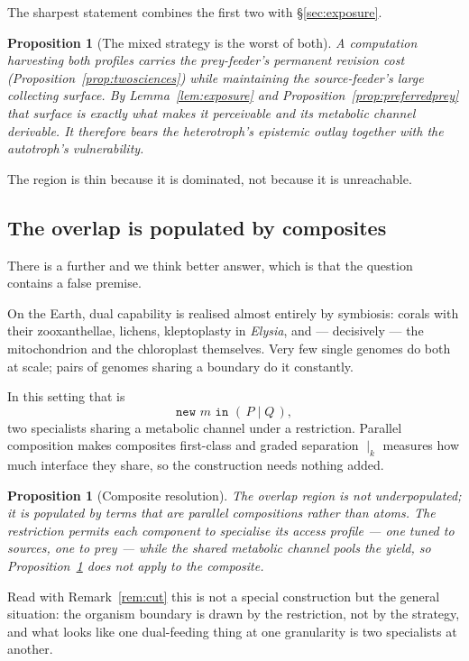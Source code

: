 \documentclass[11pt]{article}
\theoremstyle{plain}
\newtheorem{proposition}[theorem]{Proposition}
\theoremstyle{definition}
\begin{document}
The sharpest statement combines the first two with \S\ref{sec:exposure}.

\begin{proposition}[The mixed strategy is the worst of both]
\label{prop:worstofboth}
A computation harvesting both profiles carries the prey-feeder's permanent revision cost
(Proposition~\ref{prop:twosciences}) while maintaining the source-feeder's large collecting surface.
By Lemma~\ref{lem:exposure} and Proposition~\ref{prop:preferredprey} that surface is exactly what makes
it perceivable and its metabolic channel derivable. It therefore bears the heterotroph's epistemic
outlay together with the autotroph's vulnerability.
\end{proposition}

The region is thin because it is dominated, not because it is unreachable.

\subsection{The overlap is populated by composites}

There is a further and we think better answer, which is that the question contains a false premise.

On the Earth, dual capability is realised almost entirely by symbiosis: corals with their
zooxanthellae, lichens, kleptoplasty in \emph{Elysia}, and --- decisively --- the mitochondrion and
the chloroplast themselves. Very few single genomes do both at scale; pairs of genomes sharing a
boundary do it constantly.

In this setting that is
\[
\texttt{new } m \texttt{ in } (\,P \mid Q\,) ,
\]
two specialists sharing a metabolic channel under a restriction. Parallel composition makes composites
first-class and graded separation $\mid_k$ measures how much interface they share, so the construction
needs nothing added.

\begin{proposition}[Composite resolution]
\label{prop:composite}
The overlap region is not underpopulated; it is populated by terms that are parallel compositions
rather than atoms. The restriction permits each component to specialise its access profile --- one
tuned to sources, one to prey --- while the shared metabolic channel pools the yield, so
Proposition~\ref{prop:worstofboth} does not apply to the composite.
\end{proposition}

Read with Remark~\ref{rem:cut} this is not a special construction but the general situation: the
organism boundary is drawn by the restriction, not by the strategy, and what looks like one
dual-feeding thing at one granularity is two specialists at another.
\end{document}
